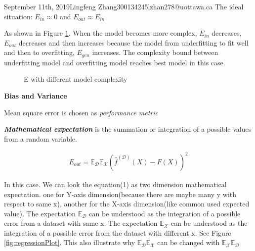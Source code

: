 \documentclass{article}
\begin{document}
\begin{lecture}{September 11th, 2019}{Lingfeng Zhang}{300134245}{lzhan278@uottawa.ca}
The ideal situation: $E_{in}\approx 0$ and $E_{out}\approx E_{in}$

As shown in Figure \ref{fig:modelComplexityE}. When the model becomes more complex, $E_{in}$ decreases, $E_{out}$ decreases and then increases because the model from underfitting to fit well and then to overfitting,  $E_{gen}$ increases. The complexity bound between underfitting model and overfitting model reaches best model in this case.

\begin{figure}[ht!]
\centering
{}
\caption{E with different model complexity}
\label{fig:modelComplexityE}
\end{figure}

\textbf{Bias and Variance}

Mean square error is chosen as \emph{performance metric}

\textbf{\emph{Mathematical expectation}} is the summation or integration of a possible values from a random variable.

\begin{eqnarray}
E_{out} = \mathbb{E} _\mathcal{D} \mathbb{E} _\mathcal{X}(\hat f^{(\mathcal{D})}(X) - F(X))^2
\end{eqnarray}

In this case. We can look the equation(1) as two dimension mathematical expectation. one for Y-axis dimension(because there are maybe many y with respect to same x), another for the X-axis dimension(like common used expected value). The expectation $\mathbb{E} _\mathcal{D}$ can be understood as the integration of a possible error from a dataset with same x. The expectation $\mathbb{E} _\mathcal{X}$ can be understood as the integration of a possible error from the dataset with different x. See Figure \ref{fig:regressionPlot}. This also illustrate why $\mathbb{E} _\mathcal{D}\mathbb{E} _\mathcal{X}$ can be changed with $\mathbb{E} _\mathcal{X}\mathbb{E} _\mathcal{D}$


\end{lecture}
\end{document}
